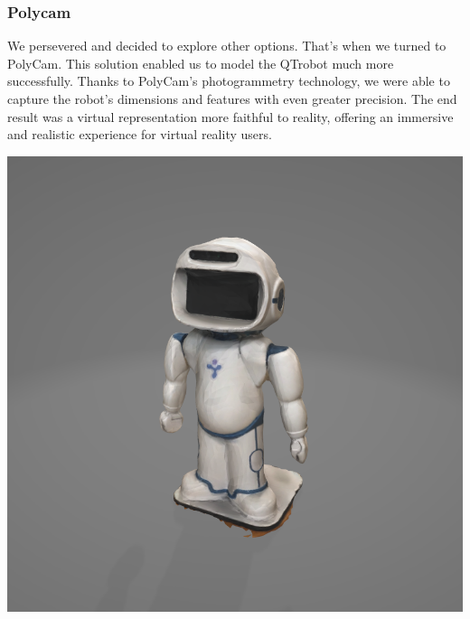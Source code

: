 \subsubsection{Polycam}
\begin{minipage}{.5\textwidth}%
We persevered and decided to explore other options. That's when we turned to PolyCam. This solution enabled us to model the QTrobot much more successfully. Thanks to PolyCam's photogrammetry technology, we were able to capture the robot's dimensions and features with even greater precision. The end result was a virtual representation more faithful to reality, offering an immersive and realistic experience for virtual reality users.\\
\end{minipage}%
\hfill
\begin{minipage}{.35\textwidth}%
\includegraphics[width=\textwidth]{Figures/QT3D_photogrametrie.png}
\end{minipage}%
\\


